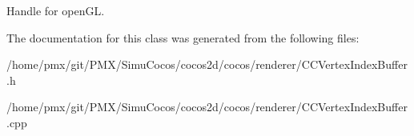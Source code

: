 Handle for open\+GL. 

The documentation for this class was generated from the following files\+:\begin{DoxyCompactItemize}
\item 
/home/pmx/git/\+P\+M\+X/\+Simu\+Cocos/cocos2d/cocos/renderer/C\+C\+Vertex\+Index\+Buffer.\+h\item 
/home/pmx/git/\+P\+M\+X/\+Simu\+Cocos/cocos2d/cocos/renderer/C\+C\+Vertex\+Index\+Buffer.\+cpp\end{DoxyCompactItemize}
